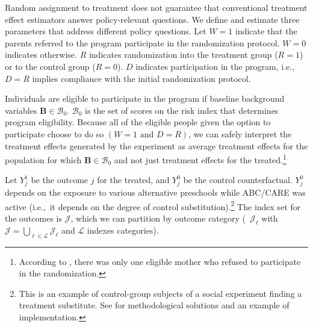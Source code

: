 Random assignment to treatment does not guarantee that conventional treatment effect estimators answer policy-relevant questions. We define and estimate three parameters that address different policy questions. Let $W=1$ indicate that the parents referred to the program participate in the randomization protocol. $W=0$ indicates otherwise. $R$ indicates randomization into the treatment group ($R = 1$) or to the control group ($R = 0$). $D$ indicates participation in the program, i.e., $D = R$ implies compliance with the initial randomization protocol.

Individuals are eligible to participate in the program if baseline background variables $\bm{B}\in\mathcal{B}_0$. $\mathcal{B}_0$ is the set of scores on the risk index that determines program eligibility. Because all of the eligible people given the option to participate choose to do so $(W=1\text{ and } D=R)$, we can safely interpret the treatment effects generated by the experiment as average treatment effects for the population for which $\bm{B}\in\mathcal{B}_0$ and not just treatment effects for the treated.\footnote{According to \citet{Ramey_Yeates_Short_1984_CD}, there was only one eligible mother who refused to participate in the randomization.}

Let $Y^1_{j}$ be the outcome $j$ for the treated, and $Y^0_{j}$ be the control counterfactual. $Y^0_{j}$ depends on the exposure to various alternative preschools while ABC/CARE was active (i.e.,\ it depends on the degree of control substitution).\footnote{This is an example of control-group subjects of a social experiment finding a treatment substitute. See \cite{Heckman_Hohmann_etal_2000_QJE} for methodological solutions and an example of implementation.} The index set for the outcomes is $\mathcal{J}$, which we can partition by outcome category (\ $\mathcal{J}_\ell$ with $\mathcal{J} = \bigcup \limits _{\ell \in \mathcal{L}} \mathcal{J}_\ell$ and $\mathcal{L}$ indexes categories).

